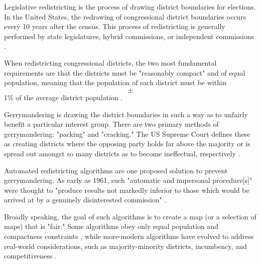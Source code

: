 \makeatletter
\section{\@title}
\makeatother

Legislative redistricting is the process of drawing district boundaries for elections. In the United States, the redrawing of congressional district boundaries occurs every 10 years after the census. This process of redistricting is generally performed by state legislatures, hybrid commissions, or independent commissions \parencite{princetongerrymanderingproject}. 

When redistricting congressional districts, the two most fundamental requirements are that the districts must be "reasonably compact" and of equal population, meaning that the population of each district must be within $$\pm$$ 1\% of the average district population \parencite{1964}. 

Gerrymandering is drawing the district boundaries in such a way as to unfairly benefit a particular interest group. There are two primary methods of gerrymandering: "packing" and "cracking." The US Supreme Court defines these as creating districts where the opposing party holds far above the majority or is spread out amongst so many districts as to become ineffectual, respectively \parencite{1986}.

Automated redistricting algorithms are one proposed solution to prevent gerrymandering. As early as 1961, such "automatic and impersonal procedure[s]" were thought to "produce results not markedly inferior to those which would be arrived at by a genuinely disinterested commission" \parencite[110]{vickrey1961}.

Broadly speaking, the goal of such algorithms is to create a map (or a selection of maps) that is "fair." Some algorithms obey only equal population and compactness constraints \parencite[e.g.][]{hu1995, altman2009, chen2013}, while more-modern algorithms have evolved to address real-world considerations, such as majority-minority districts, incumbency, and competitiveness \parencite[e.g][]{lara-caballero2019, fifield2020, mccartan2020}. 

